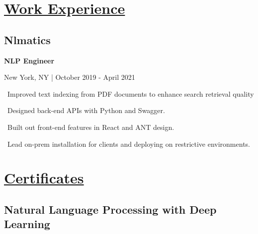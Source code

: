 \documentclass{article}
\begin{document}
\begin{minipage}[t]{0.45\textwidth\hspace{0in}}

    \section{\underline{Work Experience}}
        \vspace{-0.8em}
        \subsection{Nlmatics}
        \vspace{-0.5em}\hspace{0.1em}
        \mdseries\bfseries{NLP Engineer}
        \vspace{0.1em}
        
        \hspace{0.5em}\mdseries\textrm{New York, NY | October 2019 - April 2021}

        \vspace{0.3em}
        \hspace{1em}\textasteriskcentered \, \mdseries\textrm{Improved text indexing from PDF documents to enhance search retrieval quality}
        
        \vspace{0.3em}
        \hspace{1em}\textasteriskcentered \, \mdseries\textrm{Designed back-end APIs with Python and Swagger.}

        \vspace{0.3em}
        \hspace{1em}\textasteriskcentered \, \mdseries\textrm{Built out front-end features in React and ANT design.}
        \vspace{0.3em}
        
        \hspace{1em}\textasteriskcentered \, \mdseries\textrm{Lead on-prem installation for clients and deploying on restrictive environments.}
        \section{\underline{Certificates}}
        \subsection{Natural Language Processing with Deep Learning}
\end{minipage}
\end{document}
